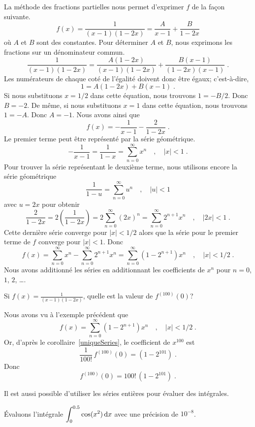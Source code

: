 {\begin{egg}
La méthode des fractions partielles nous permet d'exprimer $f$ de la façon
suivante.
\[
f(x) = \frac{1}{(x-1)(1-2x)} = \frac{A}{x-1} + \frac{B}{1-2x}
\]
où $A$ et $B$ sont des constantes.  Pour déterminer $A$ et $B$, nous exprimons
les fractions sur un dénominateur commun.
\[
\frac{1}{(x-1)(1-2x)} = \frac{A(1-2x)}{(x-1)(1-2x)} +
\frac{B(x-1)}{(1-2x)(x-1)} \; .
\]
Les numérateurs de chaque coté de l'égalité doivent donc être égaux;
c'est-à-dire,
\[
1 = A(1-2x) + B(x-1) \; .
\]
Si nous substituons $x=1/2$ dans cette équation, nous trouvons $1= -B/2$.  Donc
$B=-2$.  De même, si nous substituons $x=1$ dans cette équation, nous trouvons
$1= -A$.  Donc $A=-1$.  Nous avons ainsi que
\[
f(x) = -\frac{1}{x-1} - \frac{2}{1-2x} \; .
\]
Le premier terme peut être représenté par la série géométrique.
\[
-\frac{1}{x-1} = \frac{1}{1-x} = \sum_{n=0}^\infty x^n \quad , \quad
|x|<1 \; .
\]
Pour trouver la série représentant le deuxième terme, nous utilisons encore la
série géométrique
\[
\frac{1}{1-u} = \sum_{n=0}^\infty u^n \quad , \quad |u|<1
\]
avec $u=2x$ pour obtenir
\[
\frac{2}{1-2x} = 2 \left(\frac{1}{1-2x}\right) = 2 \sum_{n=0}^\infty (2x)^n
= \sum_{n=0}^\infty 2^{n+1} x^n \quad , \quad |2x|<1 \; .
\]
Cette dernière série converge pour $|x|<1/2$ alors que la série pour le
premier terme de $f$ converge pour $|x|<1$.  Donc
\[
f(x) = \sum_{n=0}^\infty x^n - \sum_{n=0}^\infty 2^{n+1} x^n
= \sum_{n=0}^\infty \left( 1 - 2^{n+1}\right) x^n \quad ,
\quad |x|<1/2 \; .
\]
Nous avons additionné les séries en additionnant les coefficients de
$x^n$ pour $n=0$, $1$, $2$, \ldots.
\end{egg}

\begin{egg}
Si $\displaystyle f(x) = \frac{1}{(x-1)(1-2x)}$, quelle est la valeur
de $f^{(100)}(0)$?

Nous avons vu à l'exemple précédent que
\[
f(x) = \sum_{n=0}^\infty \left( 1 - 2^{n+1}\right) x^n \quad ,
\quad |x|<1/2 \; .
\]
Or, d'après le corollaire~\ref{uniqueSeries}, le coefficient de $x^{100}$ est
\[
\frac{1}{100!}\,f^{(100)}(0) = \left( 1 - 2^{101}\right) \; .
\]
Donc
\[
f^{(100)}(0) = 100!\,\left( 1 - 2^{101}\right) \; .
\]
\end{egg}

Il est aussi possible d'utiliser les séries entières pour évaluer des
intégrales.

\begin{egg}
Évaluons l'intégrale $\displaystyle \int_0^{0.5} \cos(x^2) \,\mathrm{d}x$ avec une
précision de $10^{-8}$.


\end{egg}}
